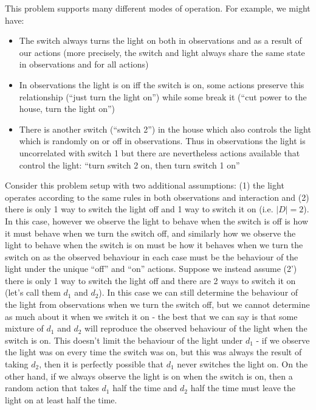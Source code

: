 This problem supports many different modes of operation. For example, we might have:
\begin{itemize}
	\item The switch always turns the light on both in observations and as a result of our actions (more precisely, the switch and light always share the same state in observations and for all actions)
	\item In observations the light is on iff the switch is on, some actions preserve this relationship (``just turn the light on'') while some break it (``cut power to the house, turn the light on'')
	\item There is another switch (``switch 2'') in the house which also controls the light which is randomly on or off in observations. Thus in observations the light is uncorrelated with switch 1 but there are nevertheless actions available that control the light: ``turn switch 2 on, then turn switch 1 on''
\end{itemize}

Consider this problem setup with two additional assumptions: (1) the light operates according to the same rules in both observations and interaction and (2) there is only 1 way to switch the light off and 1 way to switch it on (i.e. $|D|=2$). In this case, however we observe the light to behave when the switch is off is how it must behave when we turn the switch off, and similarly how we observe the light to behave when the switch is on must be how it behaves when we turn the switch on as the observed behaviour in each case must be the behaviour of the light under the unique ``off'' and ``on'' actions. Suppose we instead assume (2') there is only 1 way to switch the light off and there are 2 ways to switch it on (let's call them $d_1$ and $d_2$). In this case we can still determine the behaviour of the light from observations when we turn the switch off, but we cannot determine as much about it when we switch it on - the best that we can say is that some mixture of $d_1$ and $d_2$ will reproduce the observed behaviour of the light when the switch is on. This doesn't limit the behaviour of the light under $d_1$ - if we observe the light was on every time the switch was on, but this was always the result of taking $d_2$, then it is perfectly possible that $d_1$ never switches the light on. On the other hand, if we always observe the light is on when the switch is on, then a random action that takes $d_1$ half the time and $d_2$ half the time must leave the light on at least half the time.


